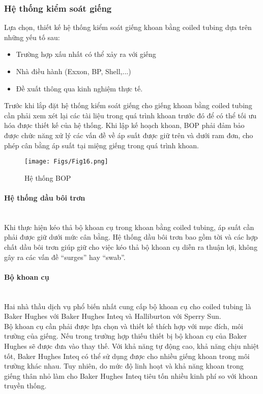 \documentclass[12pt,a4paper]{article}
\newcommand{\subsubsubsection}[1]{\paragraph{#1}\mbox{}\\}
\begin{document}
	\subsubsection{Hệ thống kiểm soát giếng}
	Lựa chọn, thiết kế hệ thống kiểm soát giếng khoan bằng coiled tubing dựa trên những yếu tố sau:
	\begin{itemize}
		\item Trường hợp xấu nhất có thể xảy ra với giếng
		\item Nhà điều hành (Exxon, BP, Shell,...)
		\item Đề xuất thông qua kinh nghiệm thực tế.
	\end{itemize}
	Trước khi lắp đặt hệ thống kiểm soát giếng cho giếng khoan bằng coiled tubing cần phải xem xét lại các tài liệu trong quá trình khoan trước đó để có thể tối ưu hóa được thiết kế của hệ thống. Khi lập kế hoạch khoan, BOP phải đảm bảo được chức năng xử lý các vấn đề về áp suất được giữ trên và dưới ram đơn, cho phép cân bằng áp suất tại miệng giếng trong quá trình khoan.
	\clearpage
	\begin{figure}[h]
	\centering
	\texttt{[image: Figs/Fig16.png]}
	\caption{Hệ thống BOP\cite{rehm2013underbalanced}}
	\end{figure}
	\subsubsubsection{Hệ thống dầu bôi trơn}
	Khi thực hiện kéo thả bộ khoan cụ trong khoan bằng coiled tubing, áp suất cần phải được giữ dưới mức cân bằng. Hệ thống dầu bôi trơn bao gồm tời và các hợp chất dầu bôi trơn giúp giữ cho việc kéo thả bộ khoan cụ diễn ra thuận lợi, không gây ra các vấn đề ``surges'' hay ``swab''. 
	\subsubsubsection{Bộ khoan cụ}
	Hai nhà thầu dịch vụ phổ biến nhất cung cấp bộ khoan cụ cho coiled tubing là Baker Hughes với Baker Hughes Inteq và Halliburton với Sperry Sun. \\
	Bộ khoan cụ cần phải được lựa chọn và thiết kế thích hợp với mục đích, môi trường của giếng. Nếu trong trường hợp thiếu thiết bị bộ khoan cụ của Baker Hughes sẽ được đưa vào thay thế. Với khả năng tự động cao, khả năng chịu nhiệt tốt, Baker Hughes Inteq có thể sử dụng được cho nhiều giếng khoan trong môi trường khác nhau. Tuy nhiên, do mức độ linh hoạt và khả năng khoan trong giếng thân nhỏ làm cho Baker Hughes Inteq tiêu tốn nhiều kinh phí so với khoan truyền thống.
\end{document}
